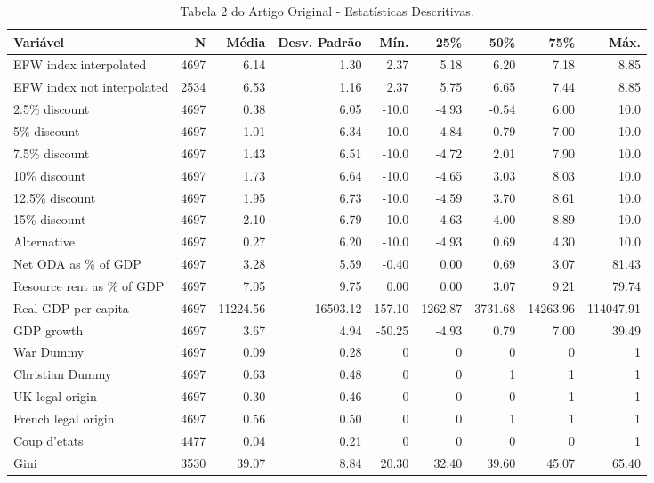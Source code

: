 \begin{table}[htbp]
    \centering
    \renewcommand{\arraystretch}{1.1}
    \captionsetup{font=small}
    \caption{Tabela 2 do Artigo Original - Estatísticas Descritivas.}
    \label{tab:tabela_descritiva}
    \scriptsize %
    \begin{tabular}{lrrrrrrrr}
        \toprule
        \textbf{Variável} & \textbf{N} & \textbf{Média} & \textbf{Desv. Padrão} & \textbf{Mín.} & \textbf{25\%} & \textbf{50\%} & \textbf{75\%} & \textbf{Máx.} \\
        \midrule
        EFW index interpolated & 4697 & 6.14 & 1.30 & 2.37 & 5.18 & 6.20 & 7.18 & 8.85 \\
        EFW index not interpolated & 2534 & 6.53 & 1.16 & 2.37 & 5.75 & 6.65 & 7.44 & 8.85 \\
        2.5\% discount & 4697 & 0.38 & 6.05 & -10.0 & -4.93 & -0.54 & 6.00 & 10.0 \\
        5\% discount & 4697 & 1.01 & 6.34 & -10.0 & -4.84 & 0.79 & 7.00 & 10.0 \\
        7.5\% discount & 4697 & 1.43 & 6.51 & -10.0 & -4.72 & 2.01 & 7.90 & 10.0 \\
        10\% discount & 4697 & 1.73 & 6.64 & -10.0 & -4.65 & 3.03 & 8.03 & 10.0 \\
        12.5\% discount & 4697 & 1.95 & 6.73 & -10.0 & -4.59 & 3.70 & 8.61 & 10.0 \\
        15\% discount & 4697 & 2.10 & 6.79 & -10.0 & -4.63 & 4.00 & 8.89 & 10.0 \\
        Alternative & 4697 & 0.27 & 6.20 & -10.0 & -4.93 & 0.69 & 4.30 & 10.0 \\
        Net ODA as \% of GDP & 4697 & 3.28 & 5.59 & -0.40 & 0.00 & 0.69 & 3.07 & 81.43 \\
        Resource rent as \% of GDP & 4697 & 7.05 & 9.75 & 0.00 & 0.00 & 3.07 & 9.21 & 79.74 \\
        Real GDP per capita & 4697 & 11224.56 & 16503.12 & 157.10 & 1262.87 & 3731.68 & 14263.96 & 114047.91 \\
        GDP growth & 4697 & 3.67 & 4.94 & -50.25 & -4.93 & 0.79 & 7.00 & 39.49 \\
        War Dummy & 4697 & 0.09 & 0.28 & 0 & 0 & 0 & 0 & 1 \\
        Christian Dummy & 4697 & 0.63 & 0.48 & 0 & 0 & 1 & 1 & 1 \\
        UK legal origin & 4697 & 0.30 & 0.46 & 0 & 0 & 0 & 1 & 1 \\
        French legal origin & 4697 & 0.56 & 0.50 & 0 & 0 & 1 & 1 & 1 \\
        Coup d'etats & 4477 & 0.04 & 0.21 & 0 & 0 & 0 & 0 & 1 \\
        Gini & 3530 & 39.07 & 8.84 & 20.30 & 32.40 & 39.60 & 45.07 & 65.40 \\
        \bottomrule
    \end{tabular}
\end{table}


